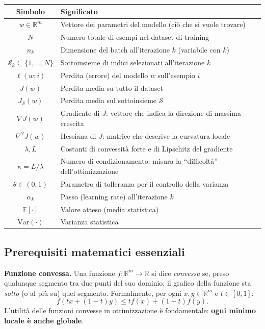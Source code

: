 \documentclass[a4paper,12pt]{article}
\numberwithin{equation}{section}
\numberwithin{figure}{section}
\numberwithin{table}{section}
\newcommand{\R}{\mathbb{R}}
\newcommand{\E}{\mathbb{E}}
\newcommand{\Var}{\mathrm{Var}}
\begin{document}
\begin{center}
\renewcommand{\arraystretch}{1.4}
\begin{tabular}{>{\bfseries}c p{}}
\toprule
Simbolo & Significato \\
\midrule
$w \in \R^m$ & Vettore dei parametri del modello (ci\`o che si vuole trovare) \\
$N$ & Numero totale di esempi nel dataset di training \\
$n_k$ & Dimensione del batch all'iterazione $k$ (variabile con $k$) \\
$\mathcal{S}_k \subseteq \{1,\dots,N\}$ & Sottoinsieme di indici selezionati all'iterazione $k$ \\
$\ell(w; i)$ & Perdita (errore) del modello $w$ sull'esempio $i$ \\
$J(w)$ & Perdita media su tutto il dataset \\
$J_{\mathcal{S}}(w)$ & Perdita media sul sottoinsieme $\mathcal{S}$ \\
$\nabla J(w)$ & Gradiente di $J$: vettore che indica la direzione di massima crescita \\
$\nabla^2 J(w)$ & Hessiana di $J$: matrice che descrive la curvatura locale \\
$\lambda, L$ & Costanti di convessit\`a forte e di Lipschitz del gradiente \\
$\kappa = L/\lambda$ & Numero di condizionamento: misura la ``difficolt\`a'' dell'ottimizzazione \\
$\theta \in (0,1)$ & Parametro di tolleranza per il controllo della varianza \\
$\alpha_k$ & Passo (learning rate) all'iterazione $k$ \\
$\E[\cdot]$ & Valore atteso (media statistica) \\
$\Var(\cdot)$ & Varianza statistica \\
\bottomrule
\end{tabular}
\end{center}

\subsection{Prerequisiti matematici essenziali}

\begin{definitionbox}
  \textbf{Funzione convessa.} Una funzione $f: \R^m \to \R$ si dice \emph{convessa} se, preso qualunque segmento tra due punti del suo dominio, il grafico della funzione sta \emph{sotto} (o al pi\`u su) quel segmento. Formalmente, per ogni $x, y \in \R^m$ e $t \in [0,1]$:
  \[
    f(tx + (1-t)y) \leq t f(x) + (1-t) f(y).
  \]
  L'utilit\`a delle funzioni convesse in ottimizzazione \`e fondamentale: \textbf{ogni minimo locale \`e anche globale}.

\end{definitionbox}
\end{document}
